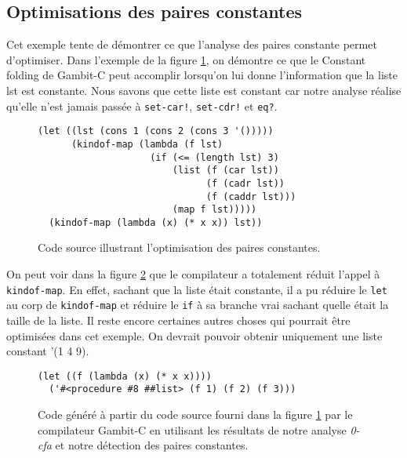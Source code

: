 
\subsection{Optimisations des paires constantes}

Cet exemple tente de démontrer ce que l'analyse des paires constante permet
d'optimiser. Dans l'exemple de la figure \ref{cfa-ex2-source}, on démontre
ce que le \og Constant folding \fg de Gambit-C peut accomplir lorsqu'on lui
donne l'information que la liste lst est constante. Nous savons que cette
liste est constant car notre analyse réalise qu'elle n'est jamais passée à
\texttt{set-car!}, \texttt{set-cdr!} et \texttt{eq?}.

\begin{figure}[htbp!]
  \begin{lstlisting}
(let ((lst (cons 1 (cons 2 (cons 3 '()))))
      (kindof-map (lambda (f lst)
                    (if (<= (length lst) 3)
                        (list (f (car lst))
                              (f (cadr lst))
                              (f (caddr lst)))
                        (map f lst)))))
  (kindof-map (lambda (x) (* x x)) lst))
  \end{lstlisting}
  \caption{Code source illustrant l'optimisation des paires constantes.}
  \label{cfa-ex2-source}
\end{figure}

On peut voir dans la figure \ref{cfa-ex2-out} que le compilateur a totalement
réduit l'appel à \texttt{kindof-map}. En effet, sachant que la liste était
constante, il a pu réduire le \texttt{let} au corp de \texttt{kindof-map} et
réduire le \texttt{if} à sa branche vrai sachant quelle était la taille de la liste.
Il reste encore certaines autres choses qui pourrait être optimisées dans cet exemple.
On devrait pouvoir obtenir uniquement une liste constant '(1 4 9).

\begin{figure}[htbp!]
  \begin{lstlisting}
(let ((f (lambda (x) (* x x))))
  ('#<procedure #8 ##list> (f 1) (f 2) (f 3)))
  \end{lstlisting}
  \caption{Code généré à partir du code source fourni dans la figure
    \ref{cfa-ex2-source} par le compilateur Gambit-C en utilisant les
    résultats de notre analyse \textit{0-cfa} et notre détection des
    paires constantes.}
  \label{cfa-ex2-out}
\end{figure}

